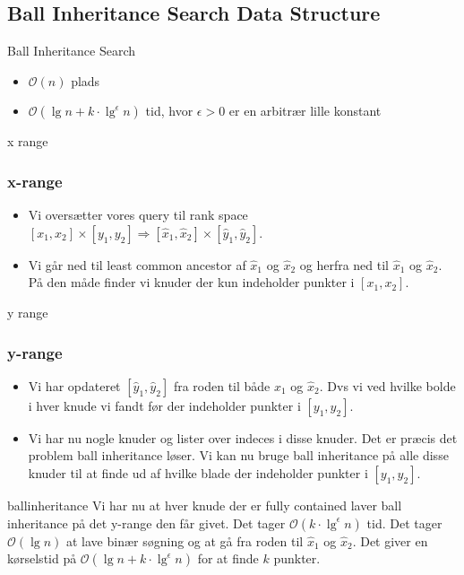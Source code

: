 \documentclass[pdf]{beamer}
\begin{document}
\subsection{Ball Inheritance Search Data Structure}
\begin{frame}{Ball Inheritance Search}
  \begin{itemize}
    \item $\mathcal{O}(n)$ plads
    \item $\mathcal{O}(\lg n + k\cdot\lg^\epsilon n)$ tid, hvor $\epsilon > 0$ er en arbitrær lille konstant
  \end{itemize}
\end{frame}

\begin{frame}{x range}
  \frametitle{x-range}
  \begin{itemize}
    \item Vi oversætter vores query til rank space $[x_1, x_2] \times [y_1, y_2] \Rightarrow [\hat{x}_1, \hat{x}_2] \times [\hat{y}_1, \hat{y}_2]$.
      \pause

    \item Vi går ned til least common ancestor af $\hat{x}_1$ og $\hat{x}_2$ og herfra ned til $\hat{x}_1$ og $\hat{x}_2$. På den måde finder vi knuder der kun indeholder punkter i $[x_1, x_2]$.
  \end{itemize}
\end{frame}

\begin{frame}{y range}
  \frametitle{y-range}
  \begin{itemize}
    \item Vi har opdateret $[\hat{y}_1, \hat{y}_2]$ fra roden til både $\hat{x}_1$ og $\hat{x}_2$. Dvs vi ved hvilke bolde i hver knude vi fandt før der indeholder punkter i $[y_1, y_2]$.
      \pause
    \item  Vi har nu nogle knuder og lister over indeces i disse knuder. Det er præcis det problem ball inheritance løser. Vi kan nu bruge ball inheritance på alle disse knuder til at finde ud af hvilke blade der indeholder punkter i $[y_1, y_2]$.
  \end{itemize}
\end{frame}

\begin{frame}{ballinheritance}
  Vi har nu at hver knude der er fully contained laver ball inheritance på det y-range den får givet. Det tager $\mathcal{O}(k\cdot\lg^\epsilon n)$ tid. Det tager $\mathcal{O}(\lg n)$ at lave binær søgning og at gå fra roden til $\hat{x}_1$ og $\hat{x}_2$.
  \pause
  Det giver en kørselstid på $\mathcal{O}(\lg n + k\cdot\lg^\epsilon n)$ for at finde $k$ punkter.
\end{frame}
\end{document}
